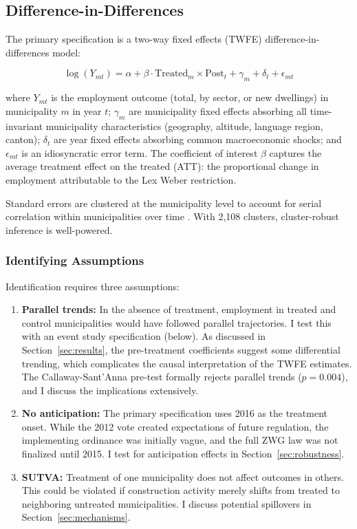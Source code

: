 \documentclass[12pt]{article}
\begin{document}
\subsection{Difference-in-Differences}

The primary specification is a two-way fixed effects (TWFE) difference-in-differences model:

\begin{equation}\label{eq:did}
\log(Y_{mt}) = \alpha + \beta \cdot \text{Treated}_m \times \text{Post}_t + \gamma_m + \delta_t + \epsilon_{mt}
\end{equation}

\noindent where $Y_{mt}$ is the employment outcome (total, by sector, or new dwellings) in municipality $m$ in year $t$; $\gamma_m$ are municipality fixed effects absorbing all time-invariant municipality characteristics (geography, altitude, language region, canton); $\delta_t$ are year fixed effects absorbing common macroeconomic shocks; and $\epsilon_{mt}$ is an idiosyncratic error term. The coefficient of interest $\beta$ captures the average treatment effect on the treated (ATT): the proportional change in employment attributable to the Lex Weber restriction.

Standard errors are clustered at the municipality level to account for serial correlation within municipalities over time \citep{roth2023}. With 2,108 clusters, cluster-robust inference is well-powered.

\subsubsection{Identifying Assumptions}

Identification requires three assumptions:

\begin{enumerate}
  \item \textbf{Parallel trends:} In the absence of treatment, employment in treated and control municipalities would have followed parallel trajectories. I test this with an event study specification (below). As discussed in Section~\ref{sec:results}, the pre-treatment coefficients suggest some differential trending, which complicates the causal interpretation of the TWFE estimates. The Callaway-Sant'Anna pre-test formally rejects parallel trends ($p = 0.004$), and I discuss the implications extensively.
  \item \textbf{No anticipation:} The primary specification uses 2016 as the treatment onset. While the 2012 vote created expectations of future regulation, the implementing ordinance was initially vague, and the full ZWG law was not finalized until 2015. I test for anticipation effects in Section~\ref{sec:robustness}.
  \item \textbf{SUTVA:} Treatment of one municipality does not affect outcomes in others. This could be violated if construction activity merely shifts from treated to neighboring untreated municipalities. I discuss potential spillovers in Section~\ref{sec:mechanisms}.
\end{enumerate}
\end{document}
